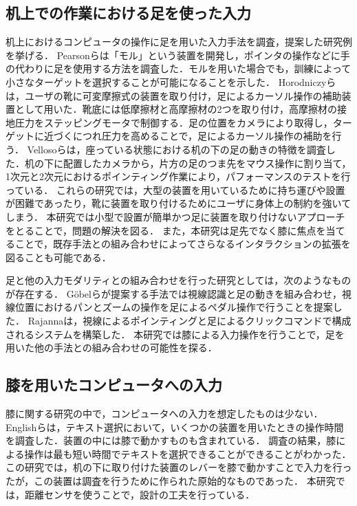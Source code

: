\documentclass[submit, techrep]{ipsj}
\begin{document}
\subsection{机上での作業における足を使った入力}
机上におけるコンピュータの操作に足を用いた入力手法を調査，提案した研究例を挙げる．
Pearsonら\cite{Pearson:1986:MMD:22627.22392, Pearson:1988:EEP:57167.57169}は「モル」という装置を開発し，ポインタの操作などに手の代わりに足を使用する方法を調査した．モルを用いた場合でも，訓練によって小さなターゲットを選択することが可能になることを示した．
Horodniczyら\cite{Horodniczy:2017:FHE:3025453.3025625}は，ユーザの靴に可変摩擦式の装置を取り付け，足によるカーソル操作の補助装置として用いた．靴底には低摩擦材と高摩擦材の2つを取り付け，高摩擦材の接地圧力をステッピングモータで制御する．足の位置をカメラにより取得し，ターゲットに近づくにつれ圧力を高めることで，足によるカーソル操作の補助を行う．
Vellosoら\cite{velloso:hal-01599657}は，座っている状態における机の下の足の動きの特徴を調査した．机の下に配置したカメラから，片方の足のつま先をマウス操作に割り当て，1次元と2次元におけるポインティング作業により，パフォーマンスのテストを行っている．
これらの研究では，大型の装置を用いているために持ち運びや設置が困難であったり，靴に装置を取り付けるためにユーザに身体上の制約を強いてしまう．
本研究では小型で設置が簡単かつ足に装置を取り付けないアプローチをとることで，問題の解決を図る．
また，本研究は足先でなく膝に焦点を当てることで，既存手法との組み合わせによってさらなるインタラクションの拡張を図ることも可能である．\par
足と他の入力モダリティとの組み合わせを行った研究としては，次のようなものが存在する．
G\"{o}belら\cite{Gobel:2013:GFI:2468356.2479610}が提案する手法では視線認識と足の動きを組み合わせ，視線位置におけるパンとズームの操作を足によるペダル操作で行うことを提案した．
Rajanna\cite{Rajanna:2016:GFI:2876456.2876462}は，視線によるポインティングと足によるクリックコマンドで構成されるシステムを構築した．
本研究では膝による入力操作を行うことで，足を用いた他の手法との組み合わせの可能性を探る．

\subsection{膝を用いたコンピュータへの入力}
膝に関する研究の中で，コンピュータへの入力を想定したものは少ない．
Englishら\cite{1698228}は，テキスト選択において，いくつかの装置を用いたときの操作時間を調査した．装置の中には膝で動かすものも含まれている．
調査の結果，膝による操作は最も短い時間でテキストを選択できることができることがわかった．
この研究では，机の下に取り付けた装置のレバーを膝で動かすことで入力を行ったが，この装置は調査を行うために作られた原始的なものであった．
本研究では，距離センサを使うことで，設計の工夫を行っている．
\end{document}
